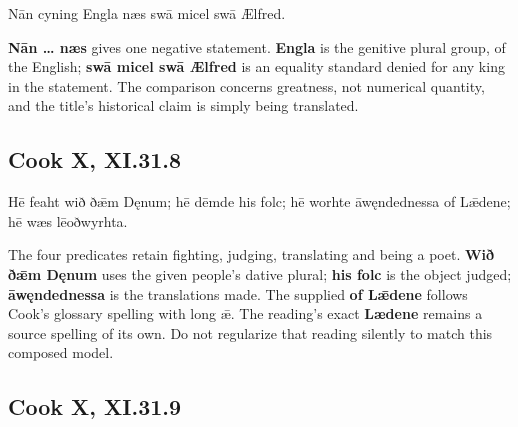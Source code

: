 \par\begin{minipage}{\linewidth}\raggedright
Nān cyning Engla næs swā micel swā Ælfred.

\textbf{Nān … næs} gives one negative statement. \textbf{Engla} is the genitive plural group, of the English; \textbf{swā micel swā Ælfred} is an equality standard denied for any king in the statement. The comparison concerns greatness, not numerical quantity, and the title’s historical claim is simply being translated.

\end{minipage}\par\addvspace{4pt}

\subsection*{Cook X, XI.31.8}

\par\begin{minipage}{\linewidth}\raggedright
Hē feaht wið ðǣm Dęnum; hē dēmde his folc; hē worhte āwęndednessa of Lǣdene; hē wæs lēoðwyrhta.

The four predicates retain fighting, judging, translating and being a poet. \textbf{Wið ðǣm Dęnum} uses the given people’s dative plural; \textbf{his folc} is the object judged; \textbf{āwęndednessa} is the translations made. The supplied \textbf{of Lǣdene} follows Cook’s glossary spelling with long ǣ. The reading’s exact \textbf{Lædene} remains a source spelling of its own. Do not regularize that reading silently to match this composed model.

\end{minipage}\par\addvspace{4pt}

\subsection*{Cook X, XI.31.9}

